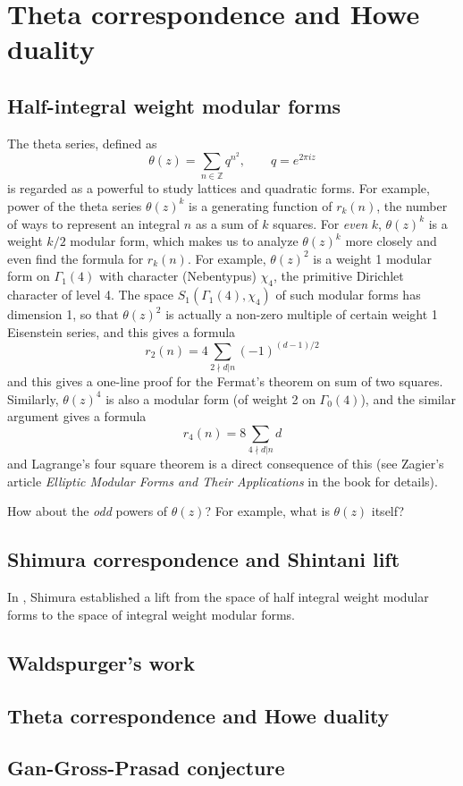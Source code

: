 
\section{Theta correspondence and Howe duality}

\subsection{Half-integral weight modular forms}
The theta series, defined as 
$$
\theta(z) = \sum_{n\in\mathbb{Z}} q^{n^{2}}, \qquad q = e^{2\pi i z}
$$
is regarded as a powerful to study lattices and quadratic forms.
For example, power of the theta series $\theta(z)^{k}$ is a generating function of $r_{k}(n)$,
the number of ways to represent an integral $n$ as a sum of $k$ squares.
For \emph{even} $k$, $\theta(z)^{k}$ is a weight $k/2$ modular form,
which makes us to analyze $\theta(z)^{k}$ more closely and even find the formula for
$r_{k}(n)$.
For example, $\theta(z)^{2}$ is a weight 1 modular form on $\Gamma_{1}(4)$ with character (Nebentypus)
$\chi_{4}$, the primitive Dirichlet character of level 4.
The space $S_{1}(\Gamma_{1}(4), \chi_{4})$ of such modular forms has dimension 1, so that $\theta(z)^{2}$
is actually a non-zero multiple of certain weight 1 Eisenstein series, and this gives a formula
$$
r_{2}(n) = 4 \sum_{2\nmid d | n} (-1)^{(d-1)/2}
$$
and this gives a one-line proof for the Fermat's theorem on sum of two squares.
Similarly, $\theta(z)^{4}$ is also a modular form (of weight 2 on $\Gamma_{0}(4)$),
and the similar argument gives a formula
$$
r_{4}(n) = 8 \sum_{4\nmid d | n} d
$$
and Lagrange's four square theorem is a direct consequence of this
(see Zagier's article \emph{Elliptic Modular Forms and Their Applications}
in the book \cite{bruinier20081} for details).

How about the \emph{odd} powers of $\theta(z)$? For example, what is $\theta(z)$ itself?

\subsection{Shimura correspondence and Shintani lift}
In \cite{shimura1973onmodular}, Shimura established a lift from the space of 
half integral weight modular forms to the space of integral weight modular forms.
\begin{theorem}
\end{theorem}

\subsection{Waldspurger's work}

\subsection{Theta correspondence and Howe duality}

\subsection{Gan-Gross-Prasad conjecture}